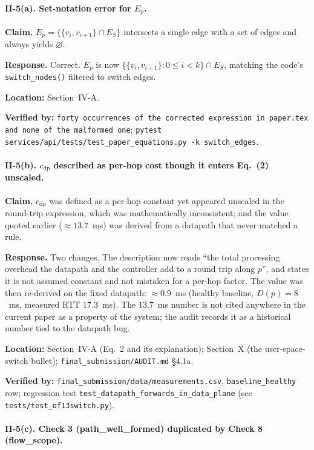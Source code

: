 \documentclass[11pt,a4paper]{article}
\begin{document}
\paragraph{II-5(a). Set-notation error for $E_p$.}

\textbf{Claim.} $E_p = \{\{v_i,v_{i+1}\} \cap E_S\}$ intersects a single edge
with a set of edges and always yields $\varnothing$.

\textbf{Response.} Correct. $E_p$ is now $\bigl\{\{v_i,v_{i+1}\} : 0 \le i < k\bigr\}
\cap E_S$, matching the code's \texttt{switch\_nodes()} filtered to switch edges.

\textbf{Location:} Section~IV-A.

\textbf{Verified by:} \texttt{forty occurrences of the corrected expression in
paper.tex and none of the malformed one};
\texttt{pytest services/api/tests/test\_paper\_equations.py -k switch\_edges}.

\paragraph{II-5(b). $c_{\mathrm{dp}}$ described as per-hop cost though it enters
Eq.~(2) unscaled.}

\textbf{Claim.} $c_{\mathrm{dp}}$ was defined as a per-hop constant yet
appeared unscaled in the round-trip expression, which was mathematically
inconsistent; and the value quoted earlier ($\approx 13.7$~ms) was
derived from a datapath that never matched a rule.

\textbf{Response.} Two changes. The description now reads ``the total
processing overhead the datapath and the controller add to a round trip
along $p$'', and states it is not assumed constant and not mistaken for a
per-hop factor. The value was then re-derived on the fixed datapath:
$\approx 0.9$~ms (healthy baseline, $D(p)=8$~ms, measured RTT $17.3$~ms).
The $13.7$~ms number is not cited anywhere in the current paper as a property
of the system; the audit records it as a historical number tied to the
datapath bug.

\textbf{Location:} Section~IV-A (Eq.~2 and its explanation); Section~X (the
user-space-switch bullet); \texttt{final\_submission/AUDIT.md} §4.1a.

\textbf{Verified by:} \texttt{final\_submission/data/measurements.csv},
\texttt{baseline\_healthy} row; regression test
\texttt{test\_datapath\_forwards\_in\_data\_plane} (see
\texttt{tests/test\_of13switch.py}).

\paragraph{II-5(c). Check 3 (path\_well\_formed) duplicated by Check 8 (flow\_scope).}
\end{document}
